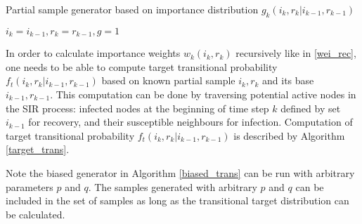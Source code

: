 \documentclass[times, utf8, diplomski]{fer}
\begin{document}
\vspace{5mm}
\begin{algorithm}[H]
\caption{Partial sample generator based on importance distribution $g_k(i_k, r_k | i_{k - 1}, r_{k - 1})$}
\label{biased_trans}
$i_{k} = i_{k - 1},r_{k} = r_{k - 1}, g = 1$\\
\end{algorithm}
\vspace{5mm} 

In order to calculate importance weights $w_k(i_k, r_k)$ recursively like in \ref{wei_rec}, one needs to be able to compute target transitional probability $f_t(i_k, r_k | i_{k - 1}, r_{k - 1})$ based on known partial sample $i_k, r_k$ and its base $i_{k - 1}, r_{k - 1}$. This computation can be done by traversing potential active nodes in the SIR process: infected nodes at the beginning 
of time step $k$ defined by set $i_{k - 1}$ for recovery, and their susceptible
 neighbours for 
 infection. Computation of target transitional probability $f_t(i_k, r_k|i_{k - 1}, r_{k - 1})$ is described by Algorithm \ref{target_trans}.

Note the biased generator in Algorithm \ref{biased_trans} can be run with arbitrary parameters $p$ and $q$. The samples generated with arbitrary $p$ and $q$ can be included in the set of samples as long as the transitional target distribution  can be calculated. 
\end{document}
